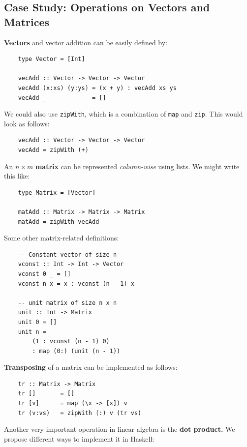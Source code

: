 \documentclass[a4paper]{extarticle}
\begin{document}
\subsection{Case Study: Operations on Vectors and Matrices}

\textbf{Vectors} and vector addition can be easily defined by:

\begin{verbatim}
    type Vector = [Int]

    vecAdd :: Vector -> Vector -> Vector
    vecAdd (x:xs) (y:ys) = (x + y) : vecAdd xs ys
    vecAdd _             = []
\end{verbatim}

We could also use \verb|zipWith|, which is a combination of \verb|map| and \verb|zip|. This would look as follows:

\begin{verbatim}
    vecAdd :: Vector -> Vector -> Vector
    vecAdd = zipWith (+)
\end{verbatim}

An \(n \times m\) \textbf{matrix} can be represented \textit{column-wise} using lists. We might write this like:

\begin{verbatim}
    type Matrix = [Vector]

    matAdd :: Matrix -> Matrix -> Matrix
    matAdd = zipWith vecAdd
\end{verbatim}

Some other matrix-related definitions:

\begin{verbatim}
    -- Constant vector of size n
    vconst :: Int -> Int -> Vector
    vconst 0 _ = []
    vconst n x = x : vconst (n - 1) x

    -- unit matrix of size n x n
    unit :: Int -> Matrix
    unit 0 = []
    unit n =
        (1 : vconst (n - 1) 0)
        : map (0:) (unit (n - 1))
\end{verbatim}

\textbf{Transposing} of a matrix can be implemented as follows:

\begin{verbatim}
    tr :: Matrix -> Matrix
    tr []       = []
    tr [v]      = map (\x -> [x]) v
    tr (v:vs)   = zipWith (:) v (tr vs)
\end{verbatim}

Another very important operation in linear algebra is the \textbf{dot product.} We propose different ways to implement it in Haskell:
\end{document}

